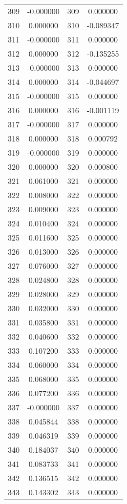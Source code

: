 \documentclass[12pt]{article}
\begin{document}
\begin{longtable}{@{}cccc@{}}
309 & -0.000000 & 309 & 0.000000 \\
310 & 0.000000 & 310 & -0.089347 \\
311 & -0.000000 & 311 & 0.000000 \\
312 & 0.000000 & 312 & -0.135255 \\
313 & -0.000000 & 313 & 0.000000 \\
314 & 0.000000 & 314 & -0.044697 \\
315 & -0.000000 & 315 & 0.000000 \\
316 & 0.000000 & 316 & -0.001119 \\
317 & -0.000000 & 317 & 0.000000 \\
318 & 0.000000 & 318 & 0.000792 \\
319 & -0.000000 & 319 & 0.000000 \\
320 & 0.000000 & 320 & 0.000800 \\
321 & 0.061000 & 321 & 0.000000 \\
322 & 0.008000 & 322 & 0.000000 \\
323 & 0.009000 & 323 & 0.000000 \\
324 & 0.010400 & 324 & 0.000000 \\
325 & 0.011600 & 325 & 0.000000 \\
326 & 0.013000 & 326 & 0.000000 \\
327 & 0.076000 & 327 & 0.000000 \\
328 & 0.024800 & 328 & 0.000000 \\
329 & 0.028000 & 329 & 0.000000 \\
330 & 0.032000 & 330 & 0.000000 \\
331 & 0.035800 & 331 & 0.000000 \\
332 & 0.040600 & 332 & 0.000000 \\
333 & 0.107200 & 333 & 0.000000 \\
334 & 0.060000 & 334 & 0.000000 \\
335 & 0.068000 & 335 & 0.000000 \\
336 & 0.077200 & 336 & 0.000000 \\
337 & -0.000000 & 337 & 0.000000 \\
338 & 0.045844 & 338 & 0.000000 \\
339 & 0.046319 & 339 & 0.000000 \\
340 & 0.184037 & 340 & 0.000000 \\
341 & 0.083733 & 341 & 0.000000 \\
342 & 0.136515 & 342 & 0.000000 \\
343 & 0.143302 & 343 & 0.000000 \\

\end{longtable}
\end{document}
